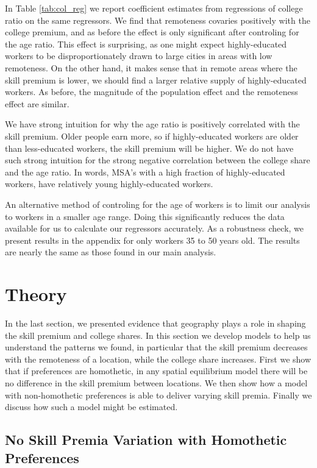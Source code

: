 \documentclass{article}
\begin{document}
In Table \ref{tab:col_reg} we report coefficient estimates from regressions of college ratio on the same regressors.  We find that remoteness covaries positively with the college premium, and as before the effect is only significant after controling for the age ratio.  This effect is surprising, as one might expect highly-educated workers to be disproportionately drawn to large cities in areas with low remoteness.  On the other hand, it makes sense that in remote areas where the skill premium is lower, we should find a larger relative supply of highly-educated workers.  As before, the magnitude of the population effect and the remoteness effect are similar.

We have strong intuition for why the age ratio is positively correlated with the skill premium.  Older people earn more, so if highly-educated workers are older than less-educated workers, the skill premium will be higher.  We do not have such strong intuition for the strong negative correlation between the college share and the age ratio.  In words, MSA's with a high fraction of highly-educated workers, have relatively young highly-educated workers.

An alternative method of controling for the age of workers is to limit our analysis to workers in a smaller age range.  Doing this significantly reduces the data available for us to calculate our regressors accurately.  As a robustness check, we present results in the appendix for only workers 35 to 50 years old.  The results are nearly the same as those found in our main analysis.

\section{Theory}

In the last section, we presented evidence that geography plays a role in shaping the skill premium and college shares.  In this section we develop models to help us understand the patterns we found, in particular that the skill premium decreases with the remoteness of a location, while the college share increases.  First we show that if preferences are homothetic, in any spatial equilibrium model there will be no difference in the skill premium between locations.  We then show how a model with non-homothetic preferences is able to deliver varying skill premia.  Finally we discuss how such a model might be estimated.

\subsection{No Skill Premia Variation with Homothetic Preferences}
\end{document}

